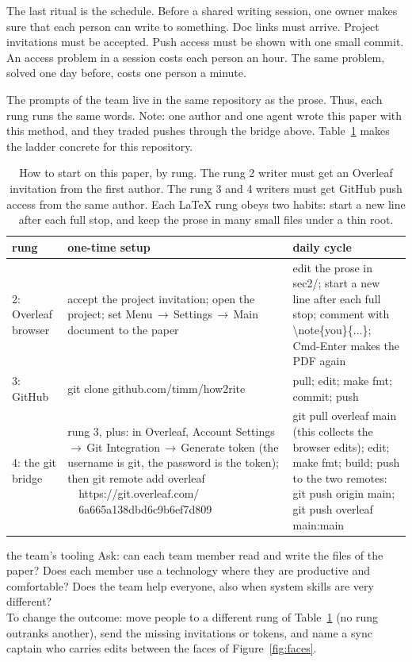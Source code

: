 The last ritual is the schedule.
Before a shared writing session, one owner makes sure that each person
can write to something.
Doc links must arrive.
Project invitations must be accepted.
Push access must be shown with one small commit.
An access problem in a session costs each person an hour.
The same problem, solved one day before, costs one person a minute.

The prompts of the team live in the same repository as the prose.
Thus, each rung runs the same words.
Note: one author and one agent wrote this paper with this method, and
they traded pushes through the bridge above.
Table~\ref{tab:bridge} makes the ladder concrete for this repository.

\begin{table}[t]
\caption{How to start on this paper, by rung.
The rung 2 writer must get an Overleaf invitation from the first
author.
The rung 3 and 4 writers must get GitHub push access from the same
author.
Each LaTeX rung obeys two habits: start a new line after each full
stop, and keep the prose in many small files under a thin root.}
\label{tab:bridge}
\small
\begin{tabular}{@{}lp{}p{}@{}}
\toprule
rung & one-time setup & daily cycle\\
\midrule
2: Overleaf browser &
accept the project invitation; open the project; set
{\ttfamily Menu\,$\to$\,Settings\,$\to$\,Main document}
to the paper &
edit the prose in {\ttfamily sec2/}; start a new line after each
full stop; comment with
{\ttfamily \textbackslash note\{you\}\{...\}};
{\ttfamily Cmd-Enter} makes the PDF again\\[0.4em]
3: GitHub &
{\ttfamily git clone github.com/timm/how2rite} &
pull; edit; {\ttfamily make fmt}; commit; push\\[0.4em]
4: the git bridge &
rung 3, plus: in Overleaf, {\ttfamily Account
Settings\,$\to$\,Git Integration\,$\to$\,Generate token} (the
username is {\ttfamily git}, the password is the token); then\newline
{\ttfamily git remote add overleaf}\newline
{\ttfamily ~~https://git.overleaf.com/}\newline
{\ttfamily ~~6a665a138dbd6c9b6ef7d809} &
{\ttfamily git pull overleaf main} (this collects the browser
edits); edit; {\ttfamily make fmt}; build; push to the two remotes:
{\ttfamily git push origin main; git push overleaf main:main}\\
\bottomrule
\end{tabular}
\end{table}

\begin{pause}{the team's tooling}
Ask: can each team member read and write the files of the paper?
Does each member use a technology where they are productive and
comfortable?
Does the team help everyone, also when system skills are very
different?\\[0.2em] To change the outcome: move people to a different
rung of Table~\ref{tab:bridge} (no rung outranks another), send the
missing invitations or tokens, and name a sync captain who carries
edits between the faces of Figure~\ref{fig:faces}.
\end{pause}
